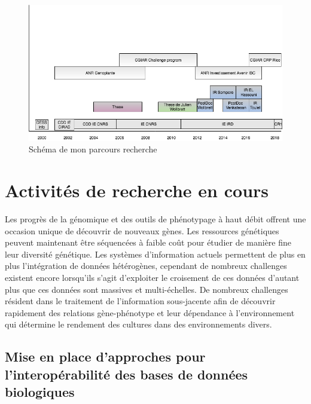 \begin{figure}[!ht]
\begin{center}
	\includegraphics[width=1\textwidth]{Figures/Parcours-overview.png}
\end{center}
\caption{\label{overview} Schéma de mon parcours recherche}
\end{figure}



\section{Activités de recherche en cours}

Les progrès de la génomique et des outils de phénotypage à haut débit offrent une occasion unique de découvrir de nouveaux gènes. Les ressources génétiques peuvent maintenant être séquencées à faible coût pour étudier de manière fine leur diversité génétique. Les systèmes d'information actuels permettent de plus en plus l'intégration de données hétérogènes, cependant de nombreux challenges existent encore lorsqu'ils s'agit d'exploiter le croisement de ces données d'autant plus que ces données sont massives et multi-échelles. De nombreux challenges résident dans le traitement de l'information sous-jacente afin de découvrir rapidement des relations gène-phénotype et leur dépendance à l’environnement qui détermine le rendement des cultures dans des environnements divers.

\subsection*{Mise en place d’approches pour l’interopérabilité des bases de données biologiques}\label{these}

